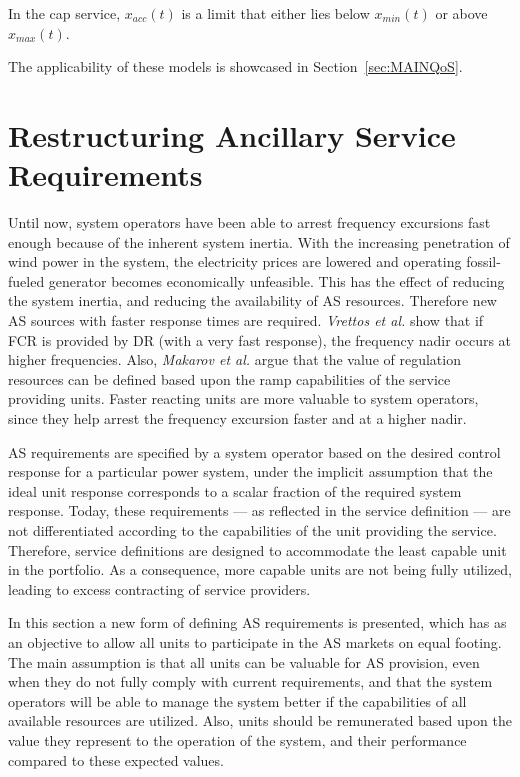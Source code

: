 In the cap service, $x_{acc}(t)$ is a limit that either lies below $x_{min}(t)$ or above $x_{max}(t)$.

The applicability of these models is showcased in Section~\ref{sec:MAINQoS}.

%
\section{Restructuring Ancillary Service Requirements} %
\label{sec:RedefiningAncillaryServiceRequirements}
Until now, system operators have been able to arrest frequency excursions fast enough because of the inherent system inertia. With the increasing penetration of wind power in the system, the electricity prices are lowered and operating fossil-fueled generator becomes economically unfeasible. This has the effect of reducing the system inertia, and reducing the availability of AS resources. Therefore new AS sources with faster response times are required. \emph{Vrettos et al.} show that if FCR is provided by DR (with a very fast response), the frequency nadir occurs at higher frequencies.
Also, \emph{Makarov et al.} argue that the value of regulation resources can be defined based upon the ramp capabilities of the service providing units. Faster reacting units are more valuable to system operators, since they help arrest the frequency excursion faster and at a higher nadir.%

AS requirements are specified by a system operator based on the desired control response for a particular power system, under the implicit assumption that the ideal unit response corresponds to a scalar fraction of the required system response. Today, these requirements --- as reflected in the service definition --- are not differentiated according to the capabilities of the unit providing the service. Therefore, service definitions are designed to accommodate the least capable unit in the portfolio. As a consequence, more capable units are not being fully utilized, leading to excess contracting of service providers.

 In this section a new form of defining AS requirements is presented, which has as an objective to allow all units to participate in the AS markets on equal footing. The main assumption is that all units can be valuable for AS provision, even when they do not fully comply with current requirements, and that the system operators will be able to manage the system better if the capabilities of all available resources are utilized. Also, units should be remunerated based upon the value they represent to the operation of the system, and their performance compared to these expected values.


